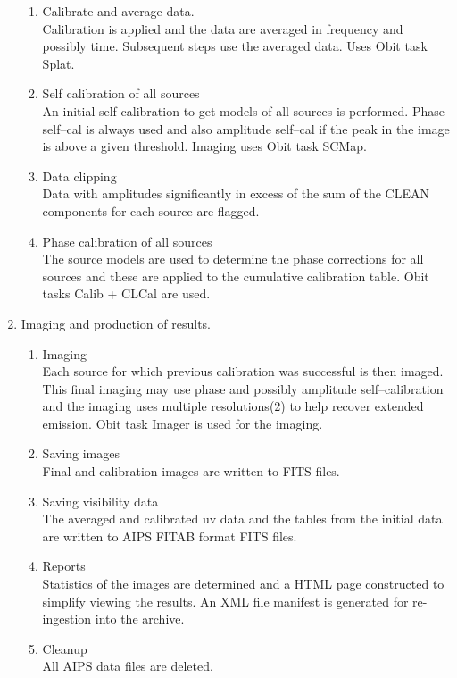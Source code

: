 \documentclass[11pt]{article}
\begin{document}
\begin{enumerate}
\begin {enumerate}
sources. 
The strong enough calibrator sources have the solutions determined for
them applied in the calibration table.
Other sources use a smoothed version of the amplitude calibration
solutions. 
\item Calibrate and average data. \\
Calibration is applied and the data are averaged in frequency and
possibly time.
Subsequent steps use the averaged data.
Uses Obit task Splat.
\item Self calibration of all sources \\
An initial self calibration to get models of all sources is
performed. 
Phase self--cal is always used and also amplitude self--cal if the
peak in the image is above a given threshold.
Imaging uses Obit task SCMap.
\item Data clipping \\
Data with amplitudes significantly in excess of the sum of the CLEAN
components for each source are flagged.
\item Phase calibration of all sources\\
The source models are used to determine the phase corrections for all
sources and these are applied to the cumulative calibration table.
Obit tasks Calib  + CLCal are used.
\end {enumerate}
\item Imaging and production of results.
\begin {enumerate}
\item Imaging\\
Each source for which previous calibration was successful is then
imaged.
This final imaging may use phase and possibly amplitude
self--calibration and the imaging uses multiple resolutions(2) to help
recover extended emission.
Obit task Imager is used for the imaging.
\item Saving images\\
Final and calibration images are written to FITS files.
\item Saving visibility data\\
The averaged and calibrated uv data and the tables from the initial
data are written to AIPS FITAB format FITS files.
\item Reports\\
Statistics of the images are determined and a HTML page constructed to
simplify viewing the results.
An XML file manifest is generated for re-ingestion into the archive.
\item Cleanup\\
All AIPS data files are deleted.
\end {enumerate}
\end {enumerate}
\end{document}
